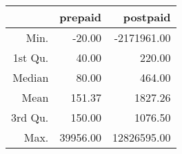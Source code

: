 \begin{table}[ht]
\centering
\begin{tabular}{rrr}
  \hline
 & prepaid & postpaid \\ 
  \hline
Min. & -20.00 & -2171961.00 \\ 
  1st Qu. & 40.00 & 220.00 \\ 
  Median & 80.00 & 464.00 \\ 
  Mean & 151.37 & 1827.26 \\ 
  3rd Qu. & 150.00 & 1076.50 \\ 
  Max. & 39956.00 & 12826595.00 \\ 
   \hline
\end{tabular}
\end{table}

